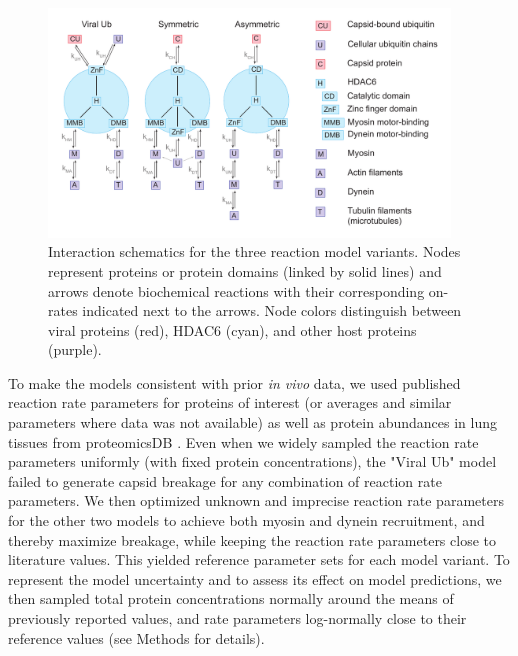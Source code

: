 \begin{figure}
\begin{center}
\includegraphics[width=0.95\textwidth, trim={0cm 0cm 0cm 0cm}, clip]{D_chapters/2_ReactionModel/ReactionModels.pdf}
\caption[Interaction schematics for the three reaction model variants]%
{Interaction schematics for the three reaction model variants. Nodes represent proteins or protein domains (linked by solid lines) and arrows denote biochemical reactions with their corresponding on-rates indicated next to the arrows. Node colors distinguish between viral proteins (red), HDAC6 (cyan), and other host proteins (purple).}
\label{figure:ReactionModelSchemes}
\end{center}
\end{figure}

To make the models consistent with prior \textit{in vivo} data, we used published reaction rate parameters for proteins of interest (or averages and similar parameters where data was not available) as well as protein abundances in lung tissues from proteomicsDB \cite{schmidt2018proteomicsdb}. Even when we widely sampled the reaction rate parameters uniformly (with fixed protein concentrations), the "Viral Ub" model failed to generate capsid breakage for any combination of reaction rate parameters. We then optimized unknown and imprecise reaction rate parameters for the other two models to achieve both myosin and dynein recruitment, and thereby maximize breakage, while keeping the reaction rate parameters close to literature values. This yielded reference parameter sets for each model variant. To represent the model uncertainty and to assess its effect on model predictions, we then sampled total protein concentrations normally around the means of previously reported values, and rate parameters log-normally close to their reference values (see Methods for details).

